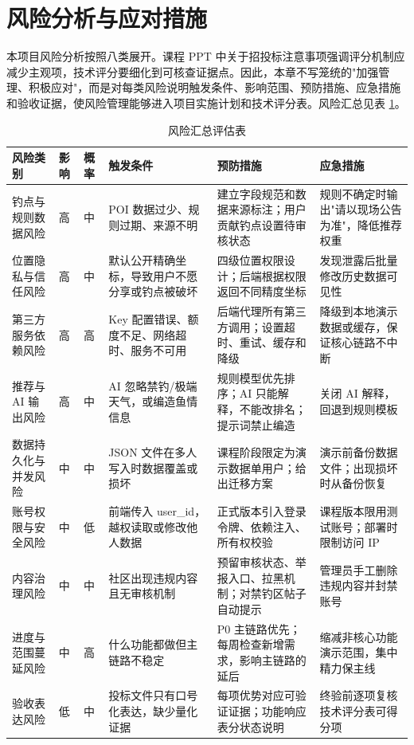 \section{风险分析与应对措施}

本项目风险分析按照八类展开。课程 PPT 中关于招投标注意事项强调评分机制应减少主观项，技术评分要细化到可核查证据点。因此，本章不写笼统的"加强管理、积极应对"，而是对每类风险说明触发条件、影响范围、预防措施、应急措施和验收证据，使风险管理能够进入项目实施计划和技术评分表。风险汇总见表 \ref{tab:risk-summary}。

\begin{table}[htbp]
  \centering\small
  \caption{风险汇总评估表}
  \label{tab:risk-summary}
  \begin{tabularx}{\textwidth}{>{\raggedright\arraybackslash}p{2.0cm}|>{\raggedright\arraybackslash}p{0.8cm}|>{\raggedright\arraybackslash}p{0.8cm}|X|>{\raggedright\arraybackslash}p{2.6cm}|>{\raggedright\arraybackslash}p{2.6cm}}
    \toprule
    \textbf{风险类别} & \textbf{影响} & \textbf{概率} & \textbf{触发条件} & \textbf{预防措施} & \textbf{应急措施} \\
    \midrule
    钓点与规则数据风险 & 高 & 中 & POI 数据过少、规则过期、来源不明 & 建立字段规范和数据来源标注；用户贡献钓点设置待审核状态 & 规则不确定时输出"请以现场公告为准"，降低推荐权重 \\
    \hline
    位置隐私与信任风险 & 高 & 中 & 默认公开精确坐标，导致用户不愿分享或钓点被破坏 & 四级位置权限设计；后端根据权限返回不同精度坐标 & 发现泄露后批量修改历史数据可见性 \\
    \hline
    第三方服务依赖风险 & 高 & 高 & Key 配置错误、额度不足、网络超时、服务不可用 & 后端代理所有第三方调用；设置超时、重试、缓存和降级 & 降级到本地演示数据或缓存，保证核心链路不中断 \\
    \hline
    推荐与 AI 输出风险 & 高 & 中 & AI 忽略禁钓/极端天气，或编造鱼情信息 & 规则模型优先排序；AI 只能解释，不能改排名；提示词禁止编造 & 关闭 AI 解释，回退到规则模板 \\
    \hline
    数据持久化与并发风险 & 中 & 中 & JSON 文件在多人写入时数据覆盖或损坏 & 课程阶段限定为演示数据单用户；给出迁移方案 & 演示前备份数据文件；出现损坏时从备份恢复 \\
    \hline
    账号权限与安全风险 & 中 & 低 & 前端传入 user\_id，越权读取或修改他人数据 & 正式版本引入登录令牌、依赖注入、所有权校验 & 课程版本限用测试账号；部署时限制访问 IP \\
    \hline
    内容治理风险 & 中 & 中 & 社区出现违规内容且无审核机制 & 预留审核状态、举报入口、拉黑机制；对禁钓区帖子自动提示 & 管理员手工删除违规内容并封禁账号 \\
    \hline
    进度与范围蔓延风险 & 中 & 高 & 什么功能都做但主链路不稳定 & P0 主链路优先；每周检查新增需求，影响主链路的延后 & 缩减非核心功能演示范围，集中精力保主线 \\
    \hline
    验收表达风险 & 低 & 中 & 投标文件只有口号化表达，缺少量化证据 & 每项优势对应可验证证据；功能响应表分状态说明 & 终验前逐项复核技术评分表可得分项 \\
    \bottomrule
  \end{tabularx}
\end{table}

